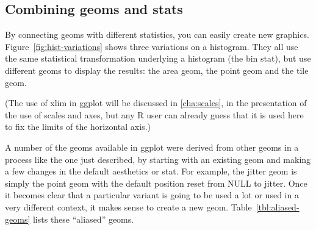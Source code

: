 \subsection{Combining geoms and stats}
\label{sub:new_plot_types}

By connecting geoms with different statistics, you can easily create new graphics.  Figure~\ref{fig:hist-variations} shows three variations on a histogram.  They all use the same statistical transformation underlying a histogram (the bin stat), but use different geoms to display the results: the area geom, the point geom and the tile geom.  

% 



(The use of xlim in ggplot will be discussed in \ref{cha:scales}, in the presentation of the use of scales and axes, but any R user can already guess that it is used here to fix the limits of the horizontal axis.)

% 


A number of the geoms available in ggplot were derived from other geoms in a process like the one just described, by starting with an existing geom and making a few changes in the default aesthetics or stat.  For example, the jitter geom is simply the point geom with the default position reset from NULL to jitter.  Once it becomes clear that a particular variant is going to be used a lot or used in a very different context, it makes sense to create a new geom. Table~\ref{tbl:aliased-geoms} lists these ``aliased'' geoms.

